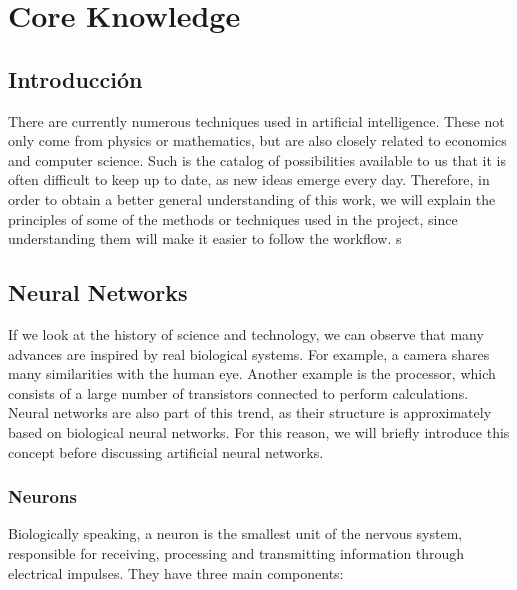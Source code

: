 \chapter{Core Knowledge}\label{cap:planificación}

\section{Introducción}

There are currently numerous techniques used in artificial intelligence. These not only come from physics or mathematics, but are also closely related to economics and computer science. Such is the catalog of possibilities available to us that it is often difficult to keep up to date, as new ideas emerge every day. Therefore, in order to obtain a better general understanding of this work, we will explain the principles of some of the methods or techniques used in the project, since understanding them will make it easier to follow the workflow. 
s
\section{Neural Networks}

If we look at the history of science and technology, we can observe that many advances are inspired by real biological systems. For example, a camera shares many similarities with the human eye. Another example is the processor, which consists of a large number of transistors connected to perform calculations. Neural networks are also part of this trend, as their structure is approximately based on biological neural networks. For this reason, we will briefly introduce this concept before discussing artificial neural networks.

\subsection{Neurons}

Biologically speaking, a neuron is the smallest unit of the nervous system, responsible for receiving, processing and transmitting information through electrical impulses. They have three main components:

